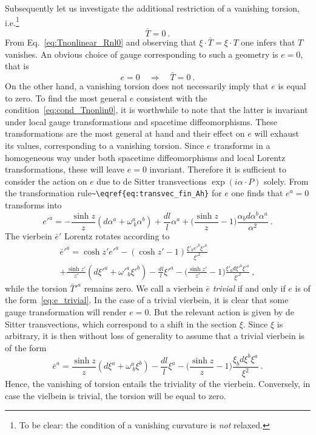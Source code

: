 \documentclass[11pt]{article}
\begin{document}
Subsequently let us investigate the additional restriction of a 
vanishing torsion, i.e.\footnote{To be clear: the condition of a 
	vanishing curvature is \emph{not} relaxed.}
\begin{equation}
	\label{eq:cond_Tnonlin0}
	\bar{T} = 0~.
\end{equation}
From Eq.~\eqref{eq:Tnonlinear_Rnl0} and observing that 
$\xi\cdot\bar{T} = \xi\cdot T$ one infers that $T$ vanishes. An 
obvious choice of gauge corresponding to such a geometry is $e = 
0$, that is
\begin{displaymath}
	e = 0 \quad\Rightarrow\quad \bar{T} = 0~.
\end{displaymath}
On the other hand, a vanishing torsion does not necessarily imply 
that $e$ is equal to zero. To find the most general $e$ 
consistent with the condition~\eqref{eq:cond_Tnonlin0}, it is 
worthwhile to note that the latter is invariant under local gauge 
transformations and spacetime diffeomorphisms.  These 
transformations are the most general at hand and their effect on 
$e$ will exhaust its values, corresponding to a vanishing 
torsion.  Since $e$ transforms in a homogeneous way under both 
spacetime diffeomorphisms and local Lorentz transformations, 
these will leave $e=0$ invariant. Therefore it is sufficient to 
consider the action on $e$ due to de Sitter transvections 
$\exp(i\alpha\cdot P)$ solely.  From the transformation 
rule\verb+~\eqref{eq:transvec_fin_Ah}+ for $e$ one finds that 
$e^a = 0$ transforms into
\begin{equation}
	\label{eq:e_trivial}
	e'^a = -\frac{\sinh z}{z} (d\alpha^a + \omega^a_{~b}\alpha^b) + 
	\frac{dl}{l} \alpha^a + \bigg( \frac{\sinh z}{z} - 1 \bigg) 
	\frac{\alpha_b d\alpha^b \alpha^a}{\alpha^2}~.
\end{equation}
The vierbein $\bar{e}'$ Lorentz rotates according 
to
\begin{multline*}
	\bar{e}'^a = \cosh z' e'^a - (\cosh z' -1) \frac{\xi'_b e'^b 
		\xi'^a}{\xi'^2}
	\\
	+ \frac{\sinh z'}{z'}(d\xi'^a + \omega'^a_{~b}\xi'^b) - 
	\frac{dl}{l} \xi'^a - \bigg( \frac{\sinh z'}{z'} - 1 \bigg) 
	\frac{\xi'_b d\xi'^b \xi'^a}{\xi'^2}~,
\end{multline*}
while the torsion $\bar{T}'^a$ remains zero. We call a vierbein 
$\bar{e}$ \emph{trivial} if and only if $e$ is of the 
form~\eqref{eq:e_trivial}. In the case of a trivial vierbein, it 
is clear that some gauge transformation will render $e = 0$. But 
the relevant action is given by de Sitter transvections, which 
correspond to a shift in the section $\xi$.
Since $\xi$ is arbitrary, it is then without loss of generality 
to assume that a trivial vierbein is of the form
\begin{equation}
	\bar{e}^a = \frac{\sinh z}{z}(d\xi^a + \omega^a_{~b}\xi^b) - 
	\frac{dl}{l} \xi^a - \bigg( \frac{\sinh z}{z} - 1 \bigg) 
	\frac{\xi_b d\xi^b \xi^a}{\xi^2}~.
\end{equation}
Hence, the vanishing of torsion entails the triviality of the 
vierbein. Conversely, in case the vielbein is trivial, the 
torsion will be equal to zero.
\end{document}
